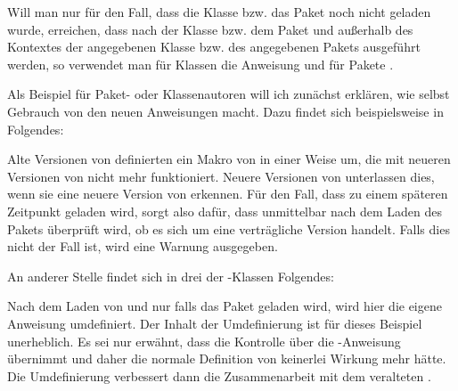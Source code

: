 Will man
nur für den Fall, dass die Klasse bzw. das Paket noch nicht geladen wurde,
erreichen, dass  nach der Klasse bzw. dem Paket und
außerhalb des Kontextes der angegebenen Klasse bzw. des angegebenen Pakets
ausgeführt werden, so verwendet man für Klassen die Anweisung
und für Pakete .%
%
\begin{Example}
  Als Beispiel für Paket- oder Klassenautoren will ich zunächst
  erklären, wie \KOMAScript{} selbst Gebrauch von den neuen
  Anweisungen macht. Dazu findet sich beispielsweise in 
  Folgendes:
\begin{lstcode}
\end{lstcode}
  Alte Versionen von  definierten ein Makro von
   in einer Weise um, die mit neueren Versionen
  von \KOMAScript{} nicht mehr funktioniert. Neuere Versionen von
   unterlassen dies, wenn sie eine neuere Version
  von \KOMAScript{} erkennen. Für den Fall, dass 
  zu einem späteren Zeitpunkt geladen wird, sorgt also 
  dafür, dass unmittelbar nach dem Laden des Pakets überprüft wird, ob
  es sich um eine verträgliche Version handelt. Falls dies nicht der
  Fall ist, wird eine Warnung ausgegeben.

  An anderer Stelle findet sich in drei der \KOMAScript-Klassen Folgendes:
\begin{lstcode}
  \AfterPackage{caption2}{%
    \renewcommand*{\setcapindent}{%
\end{lstcode}%
  Nach dem Laden von  und nur falls das Paket
  geladen wird, wird hier die \KOMAScript{} eigene Anweisung
   umdefiniert. Der Inhalt der Umdefinierung
  ist für dieses Beispiel unerheblich. Es sei nur erwähnt, dass
   die Kontrolle über die
  -Anweisung übernimmt und daher die normale
  Definition von  keinerlei Wirkung mehr
  hätte. Die Umdefinierung verbessert dann die Zusammenarbeit mit dem
  veralteten .


\end{Example}
